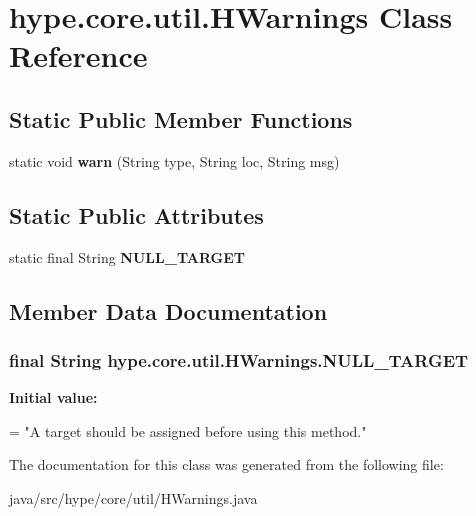 \hypertarget{classhype_1_1core_1_1util_1_1_h_warnings}{\section{hype.\-core.\-util.\-H\-Warnings Class Reference}
\label{classhype_1_1core_1_1util_1_1_h_warnings}
}
\subsection*{Static Public Member Functions}
\begin{DoxyCompactItemize}
\item 
\hypertarget{classhype_1_1core_1_1util_1_1_h_warnings_af91d40e5ca5d8814d523b548fb744680}{static void {\bfseries warn} (String type, String loc, String msg)}\label{classhype_1_1core_1_1util_1_1_h_warnings_af91d40e5ca5d8814d523b548fb744680}

\end{DoxyCompactItemize}
\subsection*{Static Public Attributes}
\begin{DoxyCompactItemize}
\item 
static final String {\bfseries N\-U\-L\-L\-\_\-\-T\-A\-R\-G\-E\-T}
\end{DoxyCompactItemize}


\subsection{Member Data Documentation}
\hypertarget{classhype_1_1core_1_1util_1_1_h_warnings_af140727a408d087ec5dee1cad42d074c}{
\subsubsection[{N\-U\-L\-L\-\_\-\-T\-A\-R\-G\-E\-T}]{\setlength{\rightskip}{0pt plus 5cm}final String hype.\-core.\-util.\-H\-Warnings.\-N\-U\-L\-L\-\_\-\-T\-A\-R\-G\-E\-T\hspace{0.3cm}{\ttfamily [static]}}}\label{classhype_1_1core_1_1util_1_1_h_warnings_af140727a408d087ec5dee1cad42d074c}
{\bfseries Initial value\-:}
\begin{DoxyCode}
=
        \textcolor{stringliteral}{"A target should be assigned before using this method."}
\end{DoxyCode}


The documentation for this class was generated from the following file\-:\begin{DoxyCompactItemize}
\item 
java/src/hype/core/util/H\-Warnings.\-java\end{DoxyCompactItemize}
